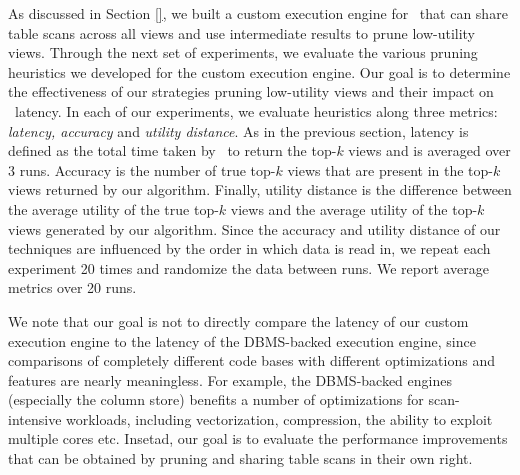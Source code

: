 As discussed in Section \ref{}, we built a custom execution engine for
\VizRecDB\ that can share table scans across all views and use intermediate
results to prune low-utility views.  
Through the next set of experiments, we evaluate the various pruning heuristics
we developed for the custom execution engine.
Our goal is to determine the effectiveness of our strategies pruning
low-utility views and their impact on \VizRecDB\ latency.
In each of our experiments, we evaluate heuristics along three metrics:
{\it latency, accuracy} and {\it utility distance}.
As in the previous section, latency is defined as the total time taken by
\VizRecDB\ to return the top-$k$ views and is averaged over 3 runs.
Accuracy is the number of true top-$k$ views that are present in the
top-$k$ views returned by our algorithm.
Finally, utility distance is the difference between the average utility of
the true top-$k$ views and the average utility of the top-$k$ views generated by
our algorithm.
Since the accuracy and utility distance of our techniques are influenced by the
order in which data is read in, we repeat each experiment 20
times and randomize the data between runs. We report average
metrics over 20 runs.

We note that our goal is not to directly compare the latency of our custom
execution engine to the latency of the DBMS-backed execution
engine, since comparisons of completely different code bases with different
optimizations and features are nearly meaningless.  For example,
 the DBMS-backed engines (especially the column store) benefits a number of optimizations
for scan-intensive workloads, including vectorization, compression, the ability to
exploit multiple cores etc.  
Insetad, our goal is to evaluate the performance improvements that can be
obtained by pruning and sharing table scans in their own right.



